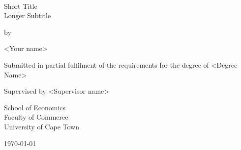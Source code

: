 ﻿﻿%
\begin{titlepage}
  \vspace*{2in} %
  
  \begin{center}
  \end{center}
  
  \begin{center}
    {\Huge ﻿Short Title \\ Longer Subtitle  \par
    }


    \bigskip%
    by

    \bigskip%
    <Your name>


    \bigskip\bigskip\bigskip\bigskip%
    Submitted in partial fulfilment of the requirements for the degree of <Degree Name>


    \bigskip\bigskip\bigskip\bigskip%
    Supervised by <Supervisor name>

    \bigskip\bigskip\bigskip\bigskip%
    School of Economics\\
    Faculty of Commerce\\
    University of Cape Town


    \bigskip\bigskip\bigskip\bigskip%
    \today %
  \end{center}

  \vspace*{\fill}
\end{titlepage}
